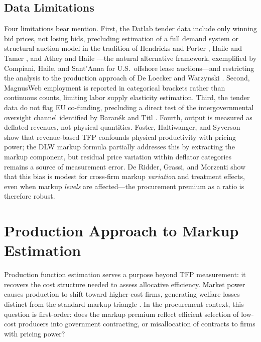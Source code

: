 \documentclass[11pt]{article}
\begin{document}


\subsection{Data Limitations}\label{sec:limitations}

Four limitations bear mention. First, the Datlab tender data include only winning bid prices, not losing bids, precluding estimation of a full demand system or structural auction model in the tradition of Hendricks and Porter \cite{HendricksPorter1988}, Haile and Tamer \cite{HaileTamer2003}, and Athey and Haile \cite{AtheyHaile2007}---the natural alternative framework, exemplified by Compiani, Haile, and Sant'Anna \cite{CompianiHaileSantAnna2020} for U.S.\ offshore lease auctions---and restricting the analysis to the production approach of De Loecker and Warzynski \cite{DLW2012}. Second, MagnusWeb employment is reported in categorical brackets rather than continuous counts, limiting labor supply elasticity estimation. Third, the tender data do not flag EU co-funding, precluding a direct test of the intergovernmental oversight channel identified by Baran\'{e}k and Titl \cite{BaranekTitl2024}. Fourth, output is measured as deflated revenues, not physical quantities. Foster, Haltiwanger, and Syverson \cite{FHS2008} show that revenue-based TFP confounds physical productivity with pricing power; the DLW markup formula partially addresses this by extracting the markup component, but residual price variation within deflator categories remains a source of measurement error. De Ridder, Grassi, and Morzenti \cite{DGM2026} show that this bias is modest for cross-firm markup \emph{variation} and treatment effects, even when markup \emph{levels} are affected---the procurement premium as a ratio is therefore robust.


\section{Production Approach to Markup Estimation}\label{sec:methodology}

Production function estimation serves a purpose beyond TFP measurement: it recovers the cost structure needed to assess allocative efficiency. Market power causes production to shift toward higher-cost firms, generating welfare losses distinct from the standard markup triangle \cite{AskerCWDL2019}. In the procurement context, this question is first-order: does the markup premium reflect efficient selection of low-cost producers into government contracting, or misallocation of contracts to firms with pricing power?
\end{document}
